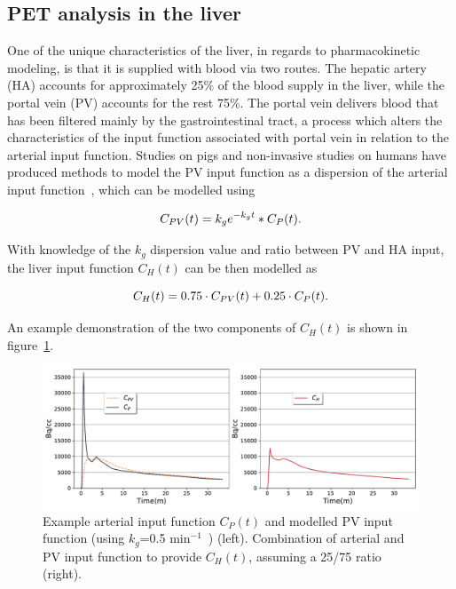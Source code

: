 \subsection{PET analysis in the liver}
\label{liver_PV_theory}
One of the unique characteristics of the liver, in regards to pharmacokinetic modeling, is that it is supplied with blood via two routes. The hepatic artery (HA) accounts for approximately 25\% of the blood supply in the liver, while the portal vein (PV) accounts for the rest 75\%. The portal vein delivers blood that has been filtered mainly by the gastrointestinal tract, a process which alters the characteristics of the input function associated with portal vein in relation to the arterial input function. 
Studies on pigs and non-invasive studies on humans have produced methods to model the PV input function as a dispersion of the arterial input function~\cite{Kudomi2008,Winterdahl2011}, which can be modelled using 

\begin{equation} 
{C_{PV}}(t)  = {k_g} e^{-k_g t} \ast C_P(t)   \\ . \\
\label{eqn:PortalVein}
\end{equation}

With knowledge of the $k_g$ dispersion value and ratio between PV and HA input, the liver input function ${C_{H}}(t)$ can be then modelled as

\begin{equation} 
{C_{H}}(t)  = 0.75 \cdot C_{PV}(t) + 0.25 \cdot C_{P}(t)  \\ . \\
\label{eqn:HepaticInput}
\end{equation}

An example demonstration of the two components of ${C_{H}}(t)$ is shown in figure~\ref{fig_2_2:LiverDualInputFunction}.

\begin{figure} [h!]
\centering
\includegraphics[scale=0.53,angle=0]{2_Theory_Methods/figures/2_2_LiverDualInputFunction.pdf}
\caption{Example arterial input function $C_{P}(t)$ and modelled PV input function (using $k_g$=0.5 min$^{-1}$~\cite{Kudomi2008}) (left). Combination of arterial and PV input function to provide ${C_{H}}(t)$, assuming a 25/75 ratio (right).} 
\label{fig_2_2:LiverDualInputFunction}
\end{figure} 

